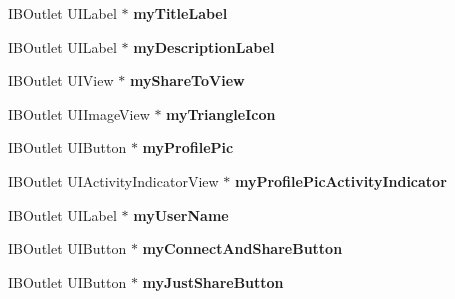 \begin{DoxyCompactItemize}
\item 
\hypertarget{interface_j_r_publish_activity_controller_aa85acec28baf9a213dabcad285971314}{
IBOutlet UILabel $\ast$ {\bfseries myTitleLabel}}
\label{interface_j_r_publish_activity_controller_aa85acec28baf9a213dabcad285971314}

\item 
\hypertarget{interface_j_r_publish_activity_controller_a44c87ebca1af0fcea50506f86ac18918}{
IBOutlet UILabel $\ast$ {\bfseries myDescriptionLabel}}
\label{interface_j_r_publish_activity_controller_a44c87ebca1af0fcea50506f86ac18918}

\item 
\hypertarget{interface_j_r_publish_activity_controller_ad254cb0e9461d6d59baeaa3bbdff1b0a}{
IBOutlet UIView $\ast$ {\bfseries myShareToView}}
\label{interface_j_r_publish_activity_controller_ad254cb0e9461d6d59baeaa3bbdff1b0a}

\item 
\hypertarget{interface_j_r_publish_activity_controller_aa903a7ad32fbd1176cd4cf129bfcf811}{
IBOutlet UIImageView $\ast$ {\bfseries myTriangleIcon}}
\label{interface_j_r_publish_activity_controller_aa903a7ad32fbd1176cd4cf129bfcf811}

\item 
\hypertarget{interface_j_r_publish_activity_controller_ad9e5c233534c83581ab8ab3af001b323}{
IBOutlet UIButton $\ast$ {\bfseries myProfilePic}}
\label{interface_j_r_publish_activity_controller_ad9e5c233534c83581ab8ab3af001b323}

\item 
\hypertarget{interface_j_r_publish_activity_controller_a54f826ef05520710e10218d27591b7ca}{
IBOutlet UIActivityIndicatorView $\ast$ {\bfseries myProfilePicActivityIndicator}}
\label{interface_j_r_publish_activity_controller_a54f826ef05520710e10218d27591b7ca}

\item 
\hypertarget{interface_j_r_publish_activity_controller_ae49a196c07f95611bc8b0fdc2689eaab}{
IBOutlet UILabel $\ast$ {\bfseries myUserName}}
\label{interface_j_r_publish_activity_controller_ae49a196c07f95611bc8b0fdc2689eaab}

\item 
\hypertarget{interface_j_r_publish_activity_controller_a20933d8e1c84681d63bf4e6d250522a9}{
IBOutlet UIButton $\ast$ {\bfseries myConnectAndShareButton}}
\label{interface_j_r_publish_activity_controller_a20933d8e1c84681d63bf4e6d250522a9}

\item 
\hypertarget{interface_j_r_publish_activity_controller_a92f1cf0f0a9d1a1cf986f83022cb47f4}{
IBOutlet UIButton $\ast$ {\bfseries myJustShareButton}}
\label{interface_j_r_publish_activity_controller_a92f1cf0f0a9d1a1cf986f83022cb47f4}


\end{DoxyCompactItemize}

